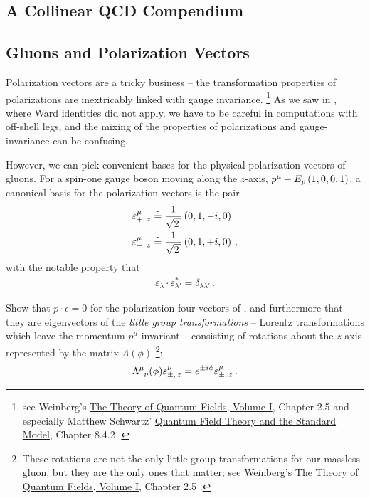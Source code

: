 \begin{subappendices}

\section{A Collinear QCD Compendium}
\label{app:qcd-compendium}

\subsection{Gluons and Polarization Vectors}

Polarization vectors are a tricky business -- the transformation properties of polarizations are inextricably linked with gauge invariance.%
\footnote{
    see Weinberg's \underline{The Theory of Quantum Fields, Volume I}, Chapter 2.5 \cite{Weinberg:1995mt} and especially Matthew Schwartz' \underline{Quantum Field Theory and the Standard Model}, Chapter 8.4.2 \cite{Schwartz:2014sze}.
}
%
As we saw in , where Ward identities did not apply, we have to be careful in computations with off-shell legs, and the mixing of the properties of polarizations and gauge-invariance can be confusing.

However, we can pick convenient bases for the physical polarization vectors of gluons.
%
For a spin-one gauge boson moving along the \(z\)-axis, \(p^\mu - E_p \left(1,0,0,1\right)\), a canonical basis for the polarization vectors is the pair
\begin{subequations}
\label{eq:z-polarization}
\begin{align}
    \varepsilon^\mu_{+,\,z}
    &\reppedby
    \frac{1}{\sqrt{2}}
    \le(0, 1, -i, 0\ri)
    \\
    \varepsilon^\mu_{-,\,z}
    &\reppedby
    \frac{1}{\sqrt{2}}
    \le(0, 1, +i, 0\ri)
    \,,
\end{align}
\end{subequations}
with the notable property that
\begin{align}
    \varepsilon_\lambda \cdot \varepsilon_{\lambda'}^*
    =
    \delta_{\lambda \lambda'}
    \,.
\end{align}


\begin{exercise}
    Show that \(p\cdot \epsilon = 0\) for the polarization four-vectors of , and furthermore that they are eigenvectors of the \textit{little group transformations} -- Lorentz transformations which leave the momentum \(p^\mu\) invariant -- consisting of rotations about the \(z\)-axis represented by the matrix \(\Lambda(\phi)\)%
    \footnote{
        These rotations are not the only little group transformations for our massless gluon, but they are the only ones that matter;
        see Weinberg's \underline{The Theory of Quantum Fields, Volume I}, Chapter 2.5 \cite{Weinberg:1995mt}.
    }:
    \begin{align}
        \Lambda\indices{^\mu_\nu}(\phi) \varepsilon^\nu_{\pm,\,z}
        =
        e^{\pm i \phi} \varepsilon^\mu_{\pm,\,z}
        \,.
    \end{align}
\end{exercise}




\end{subappendices}
